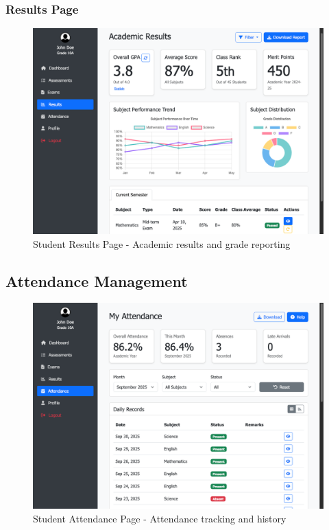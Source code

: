 \documentclass[12pt,a4paper]{article}
\begin{document}
\subsubsection{Results Page}
\begin{figure}[H]
    \centering
    \includegraphics[width=\textwidth]{student/student-results-page.png}
    \caption{Student Results Page - Academic results and grade reporting}
    \label{fig:student-results}
\end{figure}

\subsection{Attendance Management}
\begin{figure}[H]
    \centering
    \includegraphics[width=\textwidth]{student/student-attendance-page.png}
    \caption{Student Attendance Page - Attendance tracking and history}
    \label{fig:student-attendance}
\end{figure}
\end{document}
